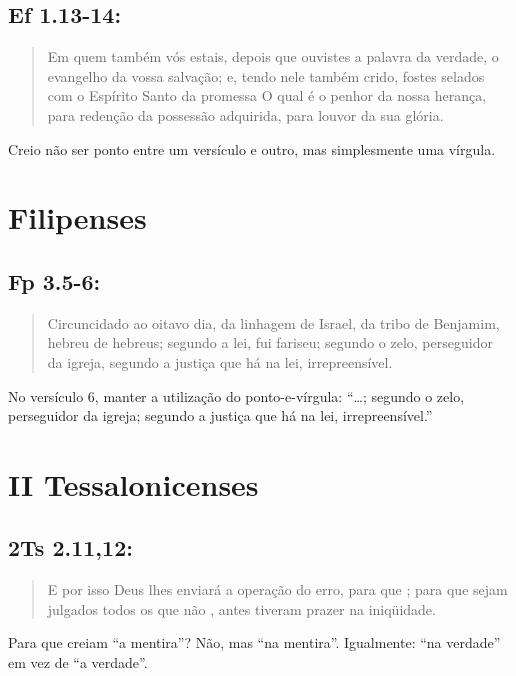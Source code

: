 \subsection*{Ef 1.13-14:}
\begin{quote}
    \small
Em quem também vós estais, depois que  ouvistes a palavra da verdade, o evangelho da vossa salvação; e,  tendo nele também crido, fostes selados com o Espírito Santo da
promessa O qual é o penhor da nossa  herança, para redenção da possessão adquirida, para louvor da sua  glória.
\end{quote}

Creio não ser ponto entre um versículo e outro, mas simplesmente uma vírgula.

\section{Filipenses}
\subsection*{Fp 3.5-6:}
\begin{quote}
    \small
Circuncidado ao oitavo dia, da linhagem de Israel, da tribo de Benjamim, hebreu de hebreus; segundo a lei, fui fariseu; segundo o zelo, perseguidor da  igreja, segundo a justiça que há na lei, irrepreensível.
\end{quote}

No versículo 6, manter a utilização do ponto-e-vírgula: ``\ldots{}; segundo o zelo, perseguidor da igreja; segundo a justiça que há na lei, irrepreensível.''

\section{II Tessalonicenses}
\subsection*{2Ts 2.11,12:}
\begin{quote}
    \small
E por isso Deus lhes enviará a operação do erro, para que ; para que sejam julgados todos os que não , antes tiveram prazer na iniqüidade.
\end{quote}
Para que creiam ``a mentira''? Não, mas ``na mentira''. Igualmente: ``na verdade'' em vez de ``a verdade''.

